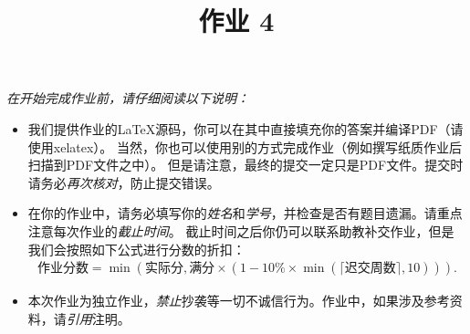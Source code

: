 \documentclass[11pt,a4paper]{article}
\title{作业 4}
\begin{document}
\maketitle

\textit{在开始完成作业前，请仔细阅读以下说明：}
\begin{itemize}
    \item 我们提供作业的\LaTeX 源码，你可以在其中直接填充你的答案并编译PDF（请使用xelatex）。
    当然，你也可以使用别的方式完成作业（例如撰写纸质作业后扫描到PDF文件之中）。
    但是请注意，最终的提交一定只是PDF文件。提交时请务必\emph{再次核对}，防止提交错误。
    \item 在你的作业中，请务必填写你的\emph{姓名}和\emph{学号}，并检查是否有题目遗漏。请重点注意每次作业的\emph{截止时间}。
    截止时间之后你仍可以联系助教补交作业，但是我们会按照如下公式进行分数的折扣：
    \begin{align*}
        \text{作业分数} = \min\left(\text{实际分}, \text{满分}\times\left(1 - 10\%\times\min\left(\lceil\text{迟交周数}\rceil, 10\right)\right)\right).
    \end{align*}
    \item 本次作业为独立作业，\emph{禁止}抄袭等一切不诚信行为。作业中，如果涉及参考资料，请\emph{引用}注明。
\end{itemize}


\end{document}
